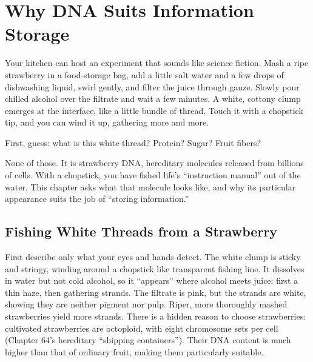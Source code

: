 \chapter{Why DNA Suits Information Storage}

\begin{kaichang}
Your kitchen can host an experiment that sounds like science fiction. Mash a ripe strawberry in a food-storage bag, add a little salt water and a few drops of dishwashing liquid, swirl gently, and filter the juice through gauze. Slowly pour chilled alcohol over the filtrate and wait a few minutes. A white, cottony clump emerges at the interface, like a little bundle of thread. Touch it with a chopstick tip, and you can wind it up, gathering more and more.

First, guess: what is this white thread? Protein? Sugar? Fruit fibers?

None of those. It is strawberry DNA, hereditary molecules released from billions of cells. With a chopstick, you have fished life's ``instruction manual'' out of the water. This chapter asks what that molecule looks like, and why its particular appearance suits the job of ``storing information.''
\end{kaichang}

\section{Fishing White Threads from a Strawberry}

First describe only what your eyes and hands detect. The white clump is sticky and stringy, winding around a chopstick like transparent fishing line. It dissolves in water but not cold alcohol, so it ``appears'' where alcohol meets juice: first a thin haze, then gathering strands. The filtrate is pink, but the strands are white, showing they are neither pigment nor pulp. Riper, more thoroughly mashed strawberries yield more strands. There is a hidden reason to choose strawberries: cultivated strawberries are octoploid, with eight chromosome sets per cell (Chapter 64's hereditary ``shipping containers''). Their DNA content is much higher than that of ordinary fruit, making them particularly suitable.

